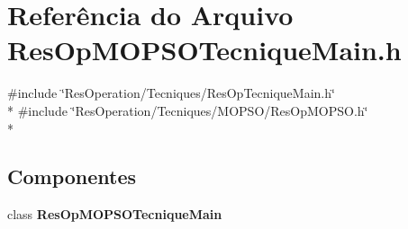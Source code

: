 \section{Referência do Arquivo Res\+Op\+M\+O\+P\+S\+O\+Tecnique\+Main.\+h}
\label{_tecniques_2_m_o_p_s_o_2_res_op_m_o_p_s_o_tecnique_main_8h}
{\ttfamily \#include \char`\"{}Res\+Operation/\+Tecniques/\+Res\+Op\+Tecnique\+Main.\+h\char`\"{}}\\*
{\ttfamily \#include \char`\"{}Res\+Operation/\+Tecniques/\+M\+O\+P\+S\+O/\+Res\+Op\+M\+O\+P\+S\+O.\+h\char`\"{}}\\*
\subsection*{Componentes}
\begin{DoxyCompactItemize}
\item 
class {\bf Res\+Op\+M\+O\+P\+S\+O\+Tecnique\+Main}
\end{DoxyCompactItemize}
